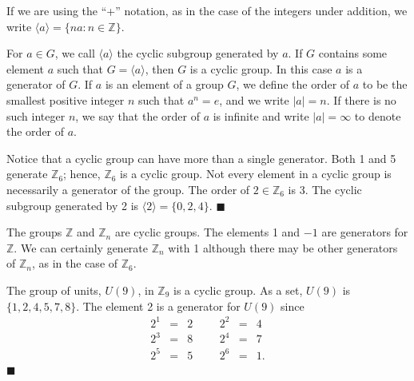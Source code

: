  
\medskip
 
 
If we are using the ``+'' notation, as in the case of the integers under
addition, we write $\langle a \rangle  = \{ na : n \in {\mathbb Z} \}$.
 
 
\medskip
 
 
For $a \in G$, we call $\langle a \rangle $ the {\bfi cyclic
subgroup\/} generated by $a$. If $G$ contains
some element $a$ such that $G = \langle a \rangle $, then $G$ is a
{\bfi cyclic group}. In this case $a$ is a {\bfi
generator\/} of $G$.  If $a$ is an
element of a group $G$, we define the {\bfi order} of $a$ to be the smallest positive integer $n$ such that $a^n= e$,
and we write $|a| = n$\label{noteelementorder}. If there is no such
integer $n$, we say that the order of $a$ is infinite and  write $|a|
= \infty$ to denote the order of $a$.
 
 
\medskip
 
 
Notice that a cyclic group can have more than a single
generator. Both 1 and 5 generate ${\mathbb Z}_6$; hence, ${\mathbb Z}_6$ is
a cyclic group. Not every element in a cyclic group is necessarily a
generator of the group. The order of $2 \in {\mathbb Z}_6$ is 3. The
cyclic subgroup generated by 2 is $\langle 2 \rangle  = \{ 0, 2, 4
\}$.  
\hspace{\fill} $\blacksquare$
 
 
\vspace{2ex}
 
 
The groups ${\mathbb Z}$ and ${\mathbb Z}_n$ are cyclic groups. The elements
1 and $-1$ are generators for ${\mathbb Z}$.  We can certainly generate
${\mathbb Z}_n$ with 1 although there may be other generators of ${\mathbb
Z}_n$, as in the case of ${\mathbb Z}_6$. 
 
 
\medskip
 
 
The group of units, $U(9)$, in ${\mathbb Z}_9$ is a cyclic group.  As a
set, $U(9)$ is $\{ 1, 2, 4, 5, 7, 8  \}$. The element 2 is a generator
for $U(9)$ since 
$$
\begin{array}{rclccrcl}
2^1 & = & 2 & & & 2^2 & = & 4 \\
2^3 & = & 8 & & & 2^4 & = & 7 \\
2^5 & = & 5 & & & 2^6 & = & 1.
\end{array}
$$
\hspace{\fill} $\blacksquare$
 
